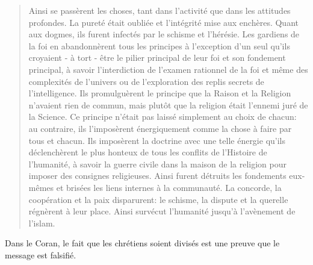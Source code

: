 \begin{quote}
Ainsi se passèrent les choses, tant dans l'activité que dans les
attitudes profondes. La pureté était oubliée et l'intégrité mise aux
enchères. Quant aux dogmes, ils furent infectés par le schisme et
l'hérésie. Les gardiens de la foi en abandonnèrent tous les principes à
l'exception d'un seul qu'ils croyaient - à tort - être le pilier
principal de leur foi et son fondement principal, à savoir
l'interdiction de l'examen rationnel de la foi et même des complexités
de l'univers ou de l'exploration des replis secrets de l'intelligence.
Ils promulguèrent le principe que la Raison et la Religion n'avaient
rien de commun, mais plutôt que la religion était l'ennemi juré de la
Science. Ce principe n'était pas laissé simplement au choix de chacun:
au contraire, ils l'imposèrent énergiquement comme la chose à faire par
tous et chacun. Ils imposèrent la doctrine avec une telle énergie qu'ils
déclenchèrent le plus honteux de tous les conflits de l'Histoire de
l'humanité, à savoir la guerre civile dans la maison de la religion pour
imposer des consignes religieuses. Ainsi furent détruits les fondements
eux-mêmes et brisées les liens internes à la communauté. La concorde, la
coopération et la paix disparurent: le schisme, la dispute et la
querelle régnèrent à leur place. Ainsi survécut l'humanité jusqu'à
l'avènement de l'islam.
\end{quote}
Dans le Coran, le fait que les chrétiens soient divisés est une preuve que le message est falsifié.

